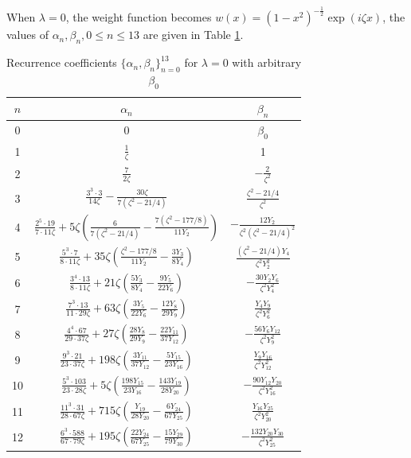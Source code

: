 \documentclass[11pt,a4paper]{article}
\numberwithin{equation}{section}
\begin{document}
When $\lambda=0$, the weight function becomes $w(x)=(1-x^2)^{-\frac{1}{2}}\exp(\mathit{i}\zeta x)$, the values of ${\alpha_{n},\beta_{n}, 0 \le n \le 13}$ are given in Table \ref{Table-1-0}.
\begin{table}[H]
	\centering
	\renewcommand{\arraystretch}{1.2}
	\setlength{\tabcolsep}{3pt}
\caption{Recurrence coefficients $\{\alpha_n,\beta_n\}_{n=0}^{13}$ for $\lambda=0$ with arbitrary $\beta_0$}\label{Table-1-0}
	\begin{tabular}{|c|c|c|}
\hline
$n$ &  $\alpha_n $&$\beta_n $  \\
\hline
0  & $0$ &$\beta_{0}$\\
\hline
1  & $\frac{1}{\zeta}$ &1\\
\hline
2  & $\frac{7}{2\zeta}$ & $-\frac{2}{\zeta^2}$\\
\hline
3  & $\frac{3^3\cdot3}{14\zeta}-\frac{30\zeta}{7(\zeta^2-21/4)}$& $\frac{\zeta^2-21/4}{\zeta^2}$ \\
\hline
4 & $\frac{2^5\cdot19}{7\cdot11\zeta}+5\zeta\left(\frac{6}{7(\zeta^2-21/4)}-\frac{7 (\zeta ^2-177/8)}{11Y_{2}}\right)$&$-\frac{12Y_{2}}{\zeta^2(\zeta^2-21/4)^2}$\\
\hline
5&$\frac{5^3\cdot7}{8\cdot 11\zeta}+35\zeta\left(\frac{\zeta^2-177/8}{11Y_{2}}-\frac{3Y_{3}}{8Y_{4}}\right)$&$\frac{(\zeta^2-21/4)Y_{4}}{\zeta^2Y_{2}^2}$ \\
\hline
6&$\frac{3^4\cdot13}{8\cdot11\zeta}+21\zeta\left(\frac{5Y_{3}}{8Y_{4}}-\frac{9Y_{5}}{22Y_{6}}\right)$&$-\frac{30Y_{2}Y_{6}}{\zeta^2Y_{4}^2}$ \\
\hline
7&$\frac{7^3\cdot13}{11\cdot29\zeta}+63\zeta\left(\frac{3Y_{5}}{22Y_{6}}-\frac{12Y_{8}}{29Y_{9}}\right)$&$\frac{Y_{4}Y_{9}}{\zeta^2Y_{6}^2}$ \\
\hline
8&$\frac{4^4\cdot67}{29\cdot37\zeta}+27\zeta\left(\frac{28Y_{8}}{29Y_{9}}-\frac{22Y_{11}}{37Y_{12}}\right)$&$-\frac{56Y_{6}Y_{12}}{\zeta^2Y_{9}^{2}}$\\\hline
9&$\frac{9^3\cdot21}{23 \cdot 37\zeta}+198\zeta\left(\frac{3Y_{11}}{37Y_{12}}-\frac{5Y_{15}}{23Y_{16}}\right)$&$\frac{Y_{9}Y_{16}}{\zeta^2Y_{12}^{2}}$\\\hline
10&$\frac{5^3\cdot103}{23\cdot28\zeta}+5\zeta\left(\frac{198Y_{15}}{23Y_{16}}-\frac{143Y_{19}}{28Y_{20}}\right)$&$-\frac{90Y_{12}Y_{20}}{\zeta^2Y_{16}^{2}}$\\\hline
11&$\frac{11^3\cdot31}{28\cdot67\zeta}+715\zeta\left(\frac{Y_{19}}{28Y_{20}}-\frac{6Y_{24}}{67Y_{25}}\right)$&$\frac{Y_{16}Y_{25}}{\zeta^2Y_{20}^{2}}$\\\hline
12&$\frac{6^3\cdot588}{67\cdot79\zeta}+195\zeta\left(\frac{22Y_{24}}{67Y_{25}}-\frac{15Y_{29}}{79Y_{30}}\right)$&$-\frac{132Y_{20}Y_{30}}{\zeta^2Y_{25}^2}$\\\hline

\end{tabular}
\end{table}
\end{document}
